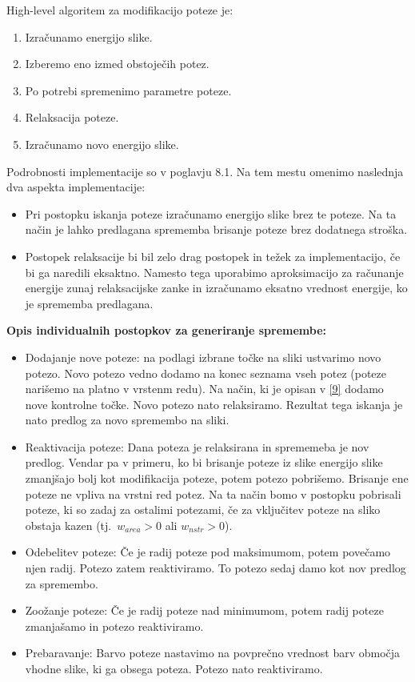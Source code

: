 High-level algoritem za modifikacijo poteze je:
%
\begin{enumerate}
  \item Izračunamo energijo slike.
  \item Izberemo eno izmed obstoječih potez.
  \item Po potrebi spremenimo parametre poteze.
  \item Relaksacija poteze.
  \item Izračunamo novo energijo slike.
\end{enumerate}
%
Podrobnosti implementacije so v poglavju 8.1. Na tem mestu omenimo naslednja dva aspekta implementacije:
%
\begin{itemize}
  \item Pri postopku iskanja poteze izračunamo energijo slike brez te poteze. Na ta način je lahko predlagana sprememba brisanje poteze brez dodatnega stroška.
  \item Postopek relaksacije bi bil zelo drag postopek in težek za implementacijo, če bi ga naredili eksaktno. Namesto tega uporabimo aproksimacijo za računanje energije zunaj relaksacijske zanke in izračunamo eksatno vrednost energije, ko je sprememba predlagana.
\end{itemize}
%
\textbf{Opis individualnih postopkov za generiranje spremembe:}
%
\begin{itemize}
  \item Dodajanje nove poteze: na podlagi izbrane točke na sliki ustvarimo novo potezo. Novo potezo vedno dodamo na konec seznama vseh potez (poteze narišemo na platno v vrstenm redu). Na način, ki je opisan v \ref{9} dodamo nove kontrolne točke. Novo potezo nato relaksiramo. Rezultat tega iskanja je nato predlog za novo spremembo na sliki.
  \item Reaktivacija poteze: Dana poteza je relaksirana in sprememeba je nov predlog. Vendar pa v primeru, ko bi brisanje poteze iz slike energijo slike zmanjšajo bolj kot modifikacija poteze, potem potezo pobrišemo. Brisanje ene poteze ne vpliva na vrstni red potez. Na ta način bomo v postopku pobrisali poteze, ki so zadaj za ostalimi potezami, če za vključitev poteze na sliko obstaja kazen (tj.\ $w_{area} > 0$ ali $w_{nstr} > 0$).
  \item Odebelitev poteze: Če je radij poteze pod maksimumom, potem povečamo njen radij. Potezo zatem reaktiviramo. To potezo sedaj damo kot nov predlog za spremembo.
  \item Zoožanje poteze: Če je radij poteze nad minimumom, potem radij poteze zmanjašamo in potezo reaktiviramo.
  \item Prebaravanje: Barvo poteze nastavimo na povprečno vrednost barv območja vhodne slike, ki ga obsega poteza. Potezo nato reaktiviramo.
\end{itemize}
